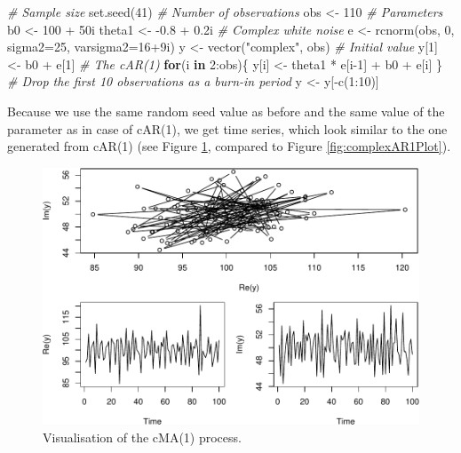\documentclass[
]{book}
\newenvironment{Shaded}{\begin{snugshade}}{\end{snugshade}}
\newcommand{\AttributeTok}[1]{\textcolor[rgb]{0.77,0.63,0.00}{#1}}
\newcommand{\CommentTok}[1]{\textcolor[rgb]{0.56,0.35,0.01}{\textit{#1}}}
\newcommand{\ControlFlowTok}[1]{\textcolor[rgb]{0.13,0.29,0.53}{\textbf{#1}}}
\newcommand{\DecValTok}[1]{\textcolor[rgb]{0.00,0.00,0.81}{#1}}
\newcommand{\FloatTok}[1]{\textcolor[rgb]{0.00,0.00,0.81}{#1}}
\newcommand{\FunctionTok}[1]{\textcolor[rgb]{0.00,0.00,0.00}{#1}}
\newcommand{\NormalTok}[1]{#1}
\newcommand{\OtherTok}[1]{\textcolor[rgb]{0.56,0.35,0.01}{#1}}
\newcommand{\SpecialCharTok}[1]{\textcolor[rgb]{0.00,0.00,0.00}{#1}}
\newcommand{\StringTok}[1]{\textcolor[rgb]{0.31,0.60,0.02}{#1}}
\begin{document}
\begin{Shaded}
\begin{Highlighting}[]
\CommentTok{\# Sample size}
\FunctionTok{set.seed}\NormalTok{(}\DecValTok{41}\NormalTok{)}
\CommentTok{\# Number of observations}
\NormalTok{obs }\OtherTok{\textless{}{-}} \DecValTok{110}
\CommentTok{\# Parameters}
\NormalTok{b0 }\OtherTok{\textless{}{-}} \DecValTok{100} \SpecialCharTok{+}\NormalTok{ 50i}
\NormalTok{theta1 }\OtherTok{\textless{}{-}} \SpecialCharTok{{-}}\FloatTok{0.8} \SpecialCharTok{+} \FloatTok{0.2}\NormalTok{i}
\CommentTok{\# Complex white noise}
\NormalTok{e }\OtherTok{\textless{}{-}} \FunctionTok{rcnorm}\NormalTok{(obs, }\DecValTok{0}\NormalTok{, }\AttributeTok{sigma2=}\DecValTok{25}\NormalTok{, }\AttributeTok{varsigma2=}\DecValTok{16}\SpecialCharTok{+}\NormalTok{9i)}
\NormalTok{y }\OtherTok{\textless{}{-}} \FunctionTok{vector}\NormalTok{(}\StringTok{"complex"}\NormalTok{, obs)}
\CommentTok{\# Initial value}
\NormalTok{y[}\DecValTok{1}\NormalTok{] }\OtherTok{\textless{}{-}}\NormalTok{ b0 }\SpecialCharTok{+}\NormalTok{ e[}\DecValTok{1}\NormalTok{]}
\CommentTok{\# The cAR(1)}
\ControlFlowTok{for}\NormalTok{(i }\ControlFlowTok{in} \DecValTok{2}\SpecialCharTok{:}\NormalTok{obs)\{}
\NormalTok{    y[i] }\OtherTok{\textless{}{-}}\NormalTok{ theta1 }\SpecialCharTok{*}\NormalTok{ e[i}\DecValTok{{-}1}\NormalTok{] }\SpecialCharTok{+}\NormalTok{ b0 }\SpecialCharTok{+}\NormalTok{ e[i]}
\NormalTok{\}}
\CommentTok{\# Drop the first 10 observations as a burn{-}in period}
\NormalTok{y }\OtherTok{\textless{}{-}}\NormalTok{ y[}\SpecialCharTok{{-}}\FunctionTok{c}\NormalTok{(}\DecValTok{1}\SpecialCharTok{:}\DecValTok{10}\NormalTok{)]}
\end{Highlighting}
\end{Shaded}

Because we use the same random seed value as before and the same value of the parameter as in case of cAR(1), we get time series, which look similar to the one generated from cAR(1) (see Figure \ref{fig:complexMA1Plot}, compared to Figure \ref{fig:complexAR1Plot}).

\begin{figure}
\centering
\includegraphics{Svetunkov---Svetunkov---Complex-Valued-Econometrics_files/figure-latex/complexMA1Plot-1.pdf}
\caption{\label{fig:complexMA1Plot}Visualisation of the cMA(1) process.}
\end{figure}
\end{document}
